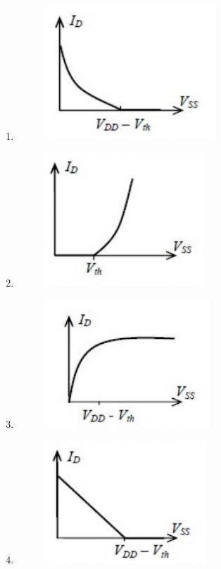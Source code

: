     \begin{enumerate}
        \item \begin{figure}[H]\centering\includegraphics[width=0.4\columnwidth]{figs/q49A.png}\end{figure}
        \item \begin{figure}[H]\centering\includegraphics[width=0.4\columnwidth]{figs/q49B.png}\end{figure}
        \item \begin{figure}[H]\centering\includegraphics[width=0.4\columnwidth]{figs/q49C.png}\end{figure}
        \item \begin{figure}[H]\centering\includegraphics[width=0.4\columnwidth]{figs/q49D.png}\end{figure}
    \end{enumerate}
    
